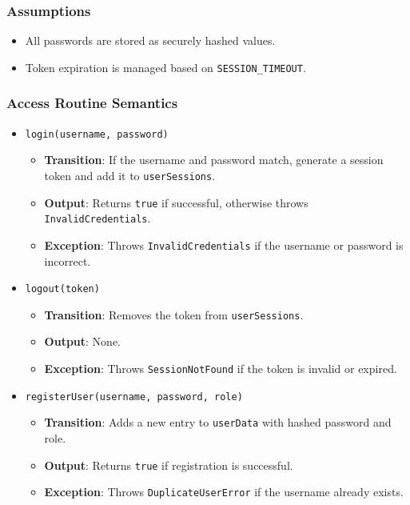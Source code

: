 \documentclass[12pt, titlepage]{article}
\begin{document}
\subsubsection{Assumptions}

\begin{itemize}
    \item All passwords are stored as securely hashed values.
    \item Token expiration is managed based on \texttt{SESSION\_TIMEOUT}.
\end{itemize}

\subsubsection{Access Routine Semantics}

\begin{itemize}
    \item \texttt{login(username, password)}
    \begin{itemize}
        \item \textbf{Transition}: If the username and password match, generate a session token and add it to \texttt{userSessions}.
        \item \textbf{Output}: Returns \texttt{true} if successful, otherwise throws \texttt{InvalidCredentials}.
        \item \textbf{Exception}: Throws \texttt{InvalidCredentials} if the username or password is incorrect.
    \end{itemize}

    \item \texttt{logout(token)}
    \begin{itemize}
        \item \textbf{Transition}: Removes the token from \texttt{userSessions}.
        \item \textbf{Output}: None.
        \item \textbf{Exception}: Throws \texttt{SessionNotFound} if the token is invalid or expired.
    \end{itemize}

    \item \texttt{registerUser(username, password, role)}
    \begin{itemize}
        \item \textbf{Transition}: Adds a new entry to \texttt{userData} with hashed password and role.
        \item \textbf{Output}: Returns \texttt{true} if registration is successful.
        \item \textbf{Exception}: Throws \texttt{DuplicateUserError} if the username already exists.
    \end{itemize}


\end{itemize}
\end{document}
